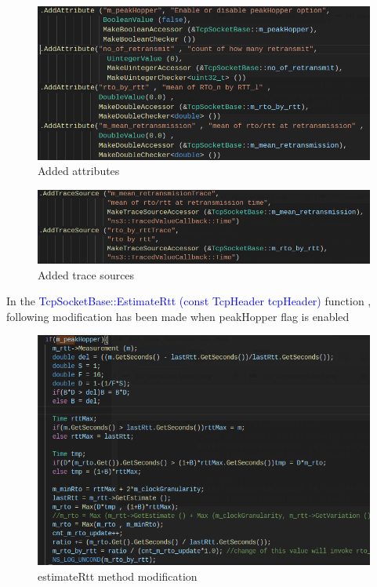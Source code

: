 \documentclass{article}[12pt]
\begin{document}
\begin{description}
    \begin{figure}[H]
    	\centering
    	\includegraphics[width=.9\textwidth]{Pictures/algo/tcp-socket-base1.png}
    	\caption{Added attributes}
    \end{figure}   
    
	\begin{figure}[H]
		\centering
		\includegraphics[width=.9\textwidth]{Pictures/algo/tcp-socket-base2.png}
		\caption{Added trace sources}
	\end{figure}   
	    
    In the \textcolor{blue}{TcpSocketBase::EstimateRtt (const TcpHeader tcpHeader)} function , following modification has been made when peakHopper flag is enabled
    
    \begin{figure}[H]
    	\centering
    	\includegraphics[width=.9\textwidth]{Pictures/algo/tcp-socket-base3.png}
    	\caption{estimateRtt method modification}
    \end{figure}   
    

\end{description}
\end{document}
